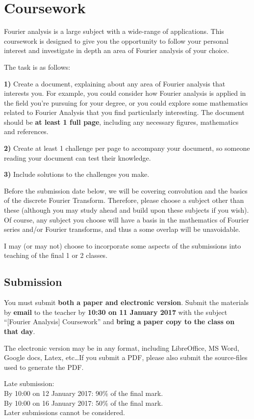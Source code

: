 \newpage
\section{Coursework}
Fourier analysis is a large subject with a wide-range of applications. This coursework is designed to give you the opportunity to follow your personal interest and investigate in depth an area of Fourier analysis of your choice.

The task is as follows:

\textbf{1)} Create a document, explaining about any area of Fourier analysis that interests you. For example, you could consider how Fourier analysis is applied in the field you're pursuing for your degree, or you could explore some mathematics related to Fourier Analysis that you find particularly interesting. The document should be \textbf{at least 1 full page}, including any necessary figures, mathematics and references.

\textbf{2)} Create at least 1 challenge per page to accompany your document, so someone reading your document can test their knowledge.

\textbf{3)} Include solutions to the challenges you make.

Before the submission date below, we will be covering convolution and the basics of the discrete Fourier Transform. Therefore, please choose a subject other than these (although you may study ahead and build upon these subjects if you wish). Of course, any subject you choose will have a basis in the mathematics of Fourier series and/or Fourier transforms, and thus a some overlap will be unavoidable.

I may (or may not) choose to incorporate some aspects of the submissions into teaching of the final 1 or 2 classes.

\subsection{Submission}
You must submit \textbf{both a paper and electronic version}. Submit the materials by \textbf{email} to the teacher by \textbf{10:30 on 11 January 2017} with the subject ``[Fourier Analysis] Coursework'' and \textbf{bring a paper copy to the class on that day}.

The electronic version may be in any format, including LibreOffice, MS Word, Google docs, Latex, etc\ldots If you submit a PDF, please also submit the source-files used to generate the PDF.

Late submission:\\
By 10:00 on 12 January 2017: 90\% of the final mark.\\
By 10:00 on 16 January 2017: 50\% of the final mark.\\
Later submissions cannot be considered.

